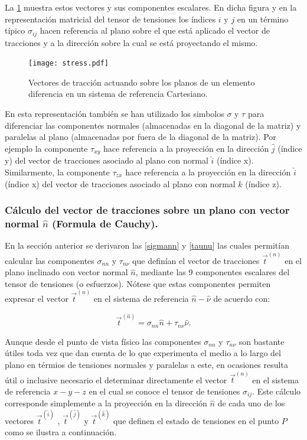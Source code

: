 \documentclass[../notas medios.tex]{subfiles}
\begin{document}
La \cref{stress} muestra estos vectores y sus componentes escalares. En dicha
figura y en la representación matricial del tensor de tensiones los índices $i$
y $j$ en un término típico $\sigma_{ij}$ hacen referencia al plano sobre el que
está aplicado el vector de tracciones y a la dirección sobre la cual se está proyectando el mismo.

\begin{figure}[H]
\centering
	\texttt{[image: stress.pdf]}
	\caption{Vectores de tracción actuando sobre los planos de un elemento diferencia en un sistema de referencia Cartesiano.}
	\label{stress}
\end{figure}

En esta representación también se han utilizado los simbolos $\sigma$ y $\tau$
para diferenciar las componentes normales (almacenadas en la diagonal de la matriz) y paralelas al plano (almacenadas por fuera de la diagonal de la matriz). Por
ejemplo la componente $\tau_{xy}$ hace referencia a la proyección en la
dirección $\hat{j}$ (índice y) del vector de tracciones asociado al plano con
normal $\hat{i}$ (índice x). Similarmente, la componente $\tau_{zx}$ hace
referencia a la proyección en la dirección $\hat{i}$ (índice x) del vector de
tracciones asociado al plano con normal $\hat{k}$ (índice z).

\subsubsection{Cálculo del vector de tracciones sobre un plano con vector normal
$\hat{n}$ (Formula de Cauchy).}
En la sección anterior se derivaron las \cref{sigmann} y
\cref{taunu} las cuales permitían calcular las componentes
$\sigma_{nn}$ y $\tau_{n\nu}$ que definían el vector de tracciones ${{\vec t}^{(n)}}$ en el plano inclinado con vector normal $\hat{n}$, mediante las 9 componentes escalares del tensor de tensiones (o esfuerzos). Nótese que estas componentes permiten expresar el vector ${{\vec t}^{(n)}}$ en el sistema de referencia $\hat{n}-\hat{\nu}$ de acuerdo con:


\[ {{\vec t}^{(\hat n)}} = {\sigma _{nn}}\hat n + {\tau _{n\nu }}\hat \nu. \]

Aunque desde el punto de vista físico las componentes  $\sigma_{nn}$ y $\tau_{n\nu}$ son bastante útiles toda vez que dan cuenta de lo que experimenta el medio a lo largo del plano en térmios de tensiones normales y paralelas a este, en ocasiones resulta útil o inclusive necesario el determinar directamente el vector ${{\vec t}^{(n)}}$ en el sistema de referencia $x-y-z$ en el cual se conoce el tensor de tensiones $\sigma_{ij}$. Este cálculo corresponde simplemente a la proyección en la dirección $\hat{n}$ de cada uno de los vectores  ${{\vec t}^{(\hat i)}}$ , ${{\vec t}^{(\hat j)}}$ y ${{\vec t}^{(\hat k)}}$ que definen el estado de tensiones en el punto $P$ como se ilustra a continuación.
\end{document}
